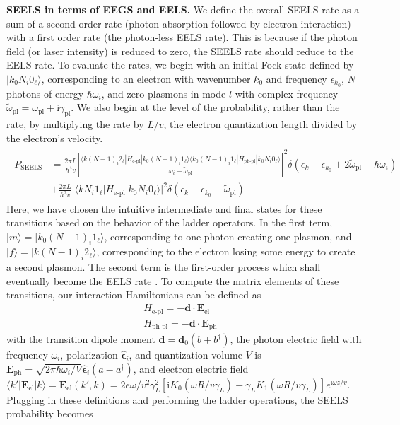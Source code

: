 \documentclass [11pt, proquest] {uwthesis}[2016/11/22]
\begin{document}
{\bf SEELS in terms of EEGS and EELS.} We define the overall SEELS rate as a sum of a second order rate (photon absorption followed by electron interaction) with a first order rate (the photon-less EELS rate). This is because if the photon field (or laser intensity) is reduced to zero, the SEELS rate should reduce to the EELS rate. To evaluate the rates, we begin with an initial Fock state defined by $|k_0N_i0_{\ell}\rangle$, corresponding to an electron with wavenumber $k_0$ and frequency $\epsilon_{k_0}$, $N$ photons of energy $\hbar\omega_i$, and zero plasmons in mode $l$ with complex frequency $\tilde{\omega}_{\textrm{pl}}=\omega_{\textrm{pl}}+\textrm{i}\gamma_{\textrm{pl}}$. We also begin at the level of the probability, rather than the rate, by multiplying the rate by $L/v$, the electron quantization length divided by the electron's velocity.
\begin{align}
\begin{split}
  P_{\textrm{SEELS}} &= \frac{2\pi L}{\hbar^4v}\left|\frac{\langle k(N-1)_i2_{\ell}|H_{\textrm{e-pl}}|k_0(N-1)_i1_{\ell}\rangle\langle k_0(N-1)_i1_{\ell}|H_{\textrm{ph-pl}}|k_0N_i0_{\ell}\rangle}{\omega_i - \tilde{\omega}_{\textrm{pl}}}\right|^2\delta(\epsilon_k - \epsilon_{k_0} + 2\tilde{\omega}_{\textrm{pl}} - \hbar\omega_i)\\
  &+ \frac{2\pi L}{\hbar^2v}|\langle kN_i1_{\ell}|H_{\textrm{e-pl}}|k_0N_i0_{\ell}\rangle|^2\delta(\epsilon_k - \epsilon_{k_0} - \tilde{\omega}_{\textrm{pl}})
  \label{overall_rate}
  \end{split}
\end{align}
Here, we have chosen the intuitive intermediate and final states for these transitions based on the behavior of the ladder operators. In the first term, $|m\rangle = |k_0(N-1)_i1_{\ell}\rangle$, corresponding to one photon creating one plasmon, and $|f\rangle = |k (N-1)_i 2_{\ell}\rangle$, corresponding to the electron losing some energy to create a second plasmon. The second term is the first-order process which shall eventually become the EELS rate \cite{EEGS}. To compute the matrix elements of these transitions, our interaction Hamiltonians can be defined as
\begin{equation}
\begin{aligned}
H_{\textrm{e-pl}} = -\textbf{d} \cdot \textbf{E}_{\textrm{el}}&\\
H_{\textrm{ph-pl}} = -\textbf{d} \cdot \textbf{E}_{\textrm{ph}}&
\end{aligned}
\end{equation}
with the transition dipole moment $\textbf{d} = \textbf{d}_0(b + b^{\dagger})$, the photon electric field with frequency $\omega_i$, polarization $\hat{\boldsymbol{\epsilon}}_i$, and quantization volume $V$ is $\textbf{E}_{\textrm{ph}} = \sqrt{2\pi\hbar\omega_i/V}\hat{\boldsymbol{\epsilon}}_i(a - a^{\dagger})$, and electron electric field $\langle k'|\textbf{E}_{\textrm{el}}|k\rangle = \textbf{E}_{\textrm{el}}(k',k) = 2e\omega/v^2\gamma_L^2[\textrm{i}K_0(\omega R/v\gamma_L)-\gamma_LK_1(\omega R/v\gamma_L)]e^{\textrm{i}\omega z/v}$. Plugging in these definitions and performing the ladder operations, the SEELS probability becomes
\end{document}
